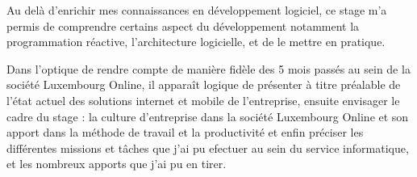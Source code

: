 	Au delà d'enrichir mes connaissances en développement logiciel, ce stage m'a permis de comprendre certains aspect du développement notamment la programmation réactive, l'architecture logicielle,  et de le mettre en pratique.
	
	Dans l'optique de rendre compte de manière fidèle des 5 mois passés au sein de la société  Luxembourg Online, il apparaît logique de présenter à titre préalable de l'état actuel des solutions internet et mobile de l'entreprise, ensuite envisager le cadre du stage : la culture d'entreprise dans la société Luxembourg Online et son apport dans la méthode de travail et la productivité et enfin préciser les différentes missions et tâches que j'ai pu efectuer au sein du service informatique, et les nombreux apports que j'ai pu en tirer.